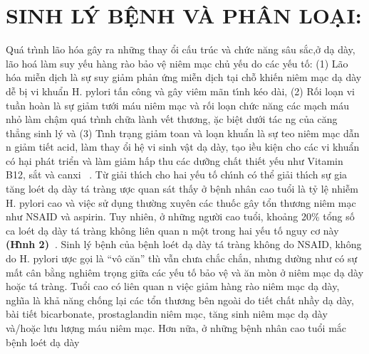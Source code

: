 \documentclass[9pt,twocolumn]{article}
\begin{document}
\section*
  {\textbf{SINH L\'{Y} BỆNH V\`{A} PH\^{A}N LO\d{A}I:}}
Qu\'{a} tr\`{\i}nh l{\~{a}}o h{\'{o}}a g\^{a}y ra những thay \text{\dj}ổi cấu tr\'{u}c v\`{a} chức n{\u{a}}ng s\^{a}u sắc,ở d{\d{a}} d\`{a}y, l{\~{a}}o ho\'{a} l\`{a}m suy y{{\'{\^{e}}}}u h\`{a}ng r\`{a}o bảo v{\^{\d{e}}} ni{\^{e}}m m{\d{a}}c chủ y{{\'{\^{e}}}}u do c\'{a}c y{{\'{\^{e}}}}u tố: (1) L{\~{a}}o h{\'{o}}a mi{\~{\^e}}n d\d{i}ch l\`{a} sự suy giảm phản ứng mi{\~{\^e}}n d\d{i}ch t{\d{a}}i chỗ khi{{\'{\^{e}}}}n ni{\^{e}}m m{\d{a}}c d{\d{a}} d\`{a}y d{\~{\^e}} b\d{i} vi khuẩn H. pylori tấn c{\^o}ng v\`{a} g\^{a}y vi{\^{e}}m m{\~{a}}n t\'{\i}nh k{\'e}o d\`{a}i, (2) Rối lo{\d{a}}n vi tuần ho\`{a}n l\`{a} sự giảm tưới m\'{a}u ni{\^{e}}m m{\d{a}}c v\`{a} rối lo{\d{a}}n chức n{\u{a}}ng c\'{a}c m{\d{a}}ch m\'{a}u nhỏ l\`{a}m ch{\^{\d{a}}}m qu\'{a} tr\`{\i}nh chữa l\`{a}nh v{{\'{\^{e}}}}t thương, \text{\dj}ặc bi{\^{\d{e}}}t dưới t\'{a}c ng của c{\u{a}}ng thẳng sinh l\'{y} v\`{a} (3) T\`{\i}nh tr{\d{a}}ng giảm toan v\`{a} lo{\d{a}}n khuẩn l\`{a} sự teo ni{\^{e}}m m{\d{a}}c dẫn n giảm ti{{\'{\^{e}}}}t acid, l\`{a}m thay \text{\dj}ổi h{\^{\d{e}}} vi sinh v{\^{\d{a}}}t d{\d{a}} d\`{a}y, t{\d{a}}o \text{\dj}iều ki{\^{\d{e}}}n cho c\'{a}c vi khuẩn c{\'{o}} h{\d{a}}i ph\'{a}t triển v\`{a} l\`{a}m giảm hấp thu c\'{a}c dưỡng chất thi{{\'{\^{e}}}}t y{{\'{\^{e}}}}u như Vitamin B12, sắt v\`{a} canxi\unskip~\cite{2901310:34531807} . Từ  giải th\'{\i}ch cho hai y{{\'{\^{e}}}}u tố ch\'{\i}nh c{\'{o}} thể giải th\'{\i}ch sự gia t{\u{a}}ng lo{\'e}t d{\d{a}} d\`{a}y t\'{a} tr\`{a}ng \text{\dj}ược quan s\'{a}t thấy ở b{\^{\d{e}}}nh nh\^{a}n cao tuổi l\`{a} tỷ l{\^{\d{e}}} nhi{\~{\^e}}m H. pylori cao v\`{a} vi{\^{\d{e}}}c sử d\d{u}ng thường xuy{\^{e}}n c\'{a}c thuốc g\^{a}y tổn thương ni{\^{e}}m m{\d{a}}c như NSAID v\`{a} aspirin. Tuy nhi{\^{e}}n, ở những người cao tuổi, khoảng 20\% \noindent \noindent tổng số ca lo{\'e}t d{\d{a}} d\`{a}y t\'{a} tr\`{a}ng kh{\^o}ng li{\^{e}}n quan n m{\^{\d{o}}}t trong hai y{{\'{\^{e}}}}u tố nguy cơ n\`{a}y \textbf{(H\`{\i}nh 2)\unskip~\cite{2901310:34531811}}. Sinh l\'{y} b{\^{\d{e}}}nh của b{\^{\d{e}}}nh lo{\'e}t d{\d{a}} d\`{a}y t\'{a} tr\`{a}ng kh{\^o}ng do NSAID, kh{\^o}ng do H. pylori \text{\dj}ược g\d{o}i l\`{a} ``v{\^o} c{\u{a}}n'' th\`{\i} vẫn chưa chắc chắn, nhưng dường như c{\'{o}} sự mất c\^{a}n bằng nghi{\^{e}}m tr\d{o}ng giữa c\'{a}c y{{\'{\^{e}}}}u tố bảo v{\^{\d{e}}} v\`{a} {\u{a}}n m\`{o}n ở ni{\^{e}}m m{\d{a}}c d{\d{a}} d\`{a}y hoặc t\'{a} tr\`{a}ng. Tuổi cao c{\'{o}} li{\^{e}}n quan n vi{\^{\d{e}}}c giảm h\`{a}ng r\`{a}o ni{\^{e}}m m{\d{a}}c d{\d{a}} d\`{a}y, ngh{\~{\i}}a l\`{a} khả n{\u{a}}ng chống l{\d{a}}i c\'{a}c tổn thương b{\^{e}}n ngo\`{a}i do ti{{\'{\^{e}}}}t chất nhầy d{\d{a}} d\`{a}y, b\`{a}i ti{{\'{\^{e}}}}t bicarbonate, prostaglandin ni{\^{e}}m m{\d{a}}c, t{\u{a}}ng sinh ni{\^{e}}m m{\d{a}}c d{\d{a}} d\`{a}y v\`{a}/hoặc lưu lượng m\'{a}u ni{\^{e}}m m{\d{a}}c. Hơn nữa, ở những b{\^{\d{e}}}nh nh\^{a}n cao tuổi mắc b{\^{\d{e}}}nh lo{\'e}t d{\d{a}} d\`{a}y 
\end{document}
